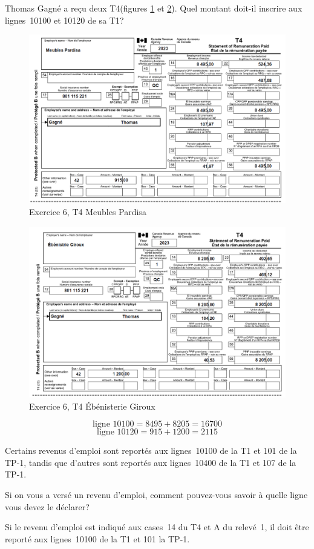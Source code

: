 \begin{question}
	Thomas Gagné a reçu deux T4(figures \ref{fig:Chap2Exercice6Q2T4numero1} et \ref{fig:Chap2Exercice6Q2T4numero2}). Quel montant doit-il inscrire aux lignes~10100 et 10120 de sa T1?
	\begin{figure}
		\centering
		\includegraphics[width=.9\textwidth]{exercice/2-6/Q2/T4-1.png}
		\caption[]{Exercice 6, T4 Meubles Pardisa}
		\label{fig:Chap2Exercice6Q2T4numero1}
	\end{figure}
	\begin{figure}
		\centering
		\includegraphics[width=.9\textwidth]{exercice/2-6/Q2/T4-2.png}
		\caption[]{Exercice 6, T4 Ébénisterie Giroux}
		\label{fig:Chap2Exercice6Q2T4numero2}
	\end{figure}
\end{question}
\[ \text{ligne~10100} = 8495 + 8205 = 16700\]
\[ \text{ligne~10120} = 915 + 1200 = 2115\]

\begin{question}
	Certains revenus d'emploi sont reportés aux lignes~10100 de la T1 et 101 de la TP-1, tandis que d'autres sont reportés aux lignes~10400 de la T1 et 107 de la TP-1. 
	
	Si on vous a versé un revenu d'emploi, comment pouvez-vous savoir à quelle ligne vous devez le déclarer?
\end{question}
Si le revenu d'emploi est indiqué aux cases~14 du T4 et A du relevé~1, il doit être reporté aux lignes~10100 de la T1 et 101 la TP-1.


